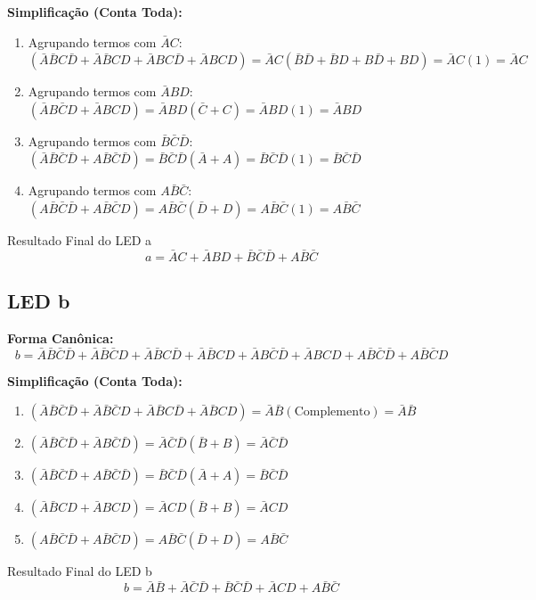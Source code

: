 \documentclass[12pt]{article}
\begin{document}
\textbf{Simplificação (Conta Toda):}
\begin{enumerate}
    \item Agrupando termos com $\bar{A}C$:
    $(\bar{A}\bar{B}C\bar{D} + \bar{A}\bar{B}CD + \bar{A}BC\bar{D} + \bar{A}BCD) = \bar{A}C(\bar{B}\bar{D} + \bar{B}D + B\bar{D} + BD) = \bar{A}C(1) = \bar{A}C$
    \item Agrupando termos com $\bar{A}BD$:
    $(\bar{A}B\bar{C}D + \bar{A}BCD) = \bar{A}BD(\bar{C} + C) = \bar{A}BD(1) = \bar{A}BD$
    \item Agrupando termos com $\bar{B}\bar{C}\bar{D}$:
    $(\bar{A}\bar{B}\bar{C}\bar{D} + A\bar{B}\bar{C}\bar{D}) = \bar{B}\bar{C}\bar{D}(\bar{A}+A) = \bar{B}\bar{C}\bar{D}(1) = \bar{B}\bar{C}\bar{D}$
    \item Agrupando termos com $A\bar{B}\bar{C}$:
    $(A\bar{B}\bar{C}\bar{D} + A\bar{B}\bar{C}D) = A\bar{B}\bar{C}(\bar{D}+D) = A\bar{B}\bar{C}(1) = A\bar{B}\bar{C}$
\end{enumerate}

\begin{block}{Resultado Final do LED a}
  \[ a = \bar{A}C + \bar{A}BD + \bar{B}\bar{C}\bar{D} + A\bar{B}\bar{C} \]
\end{block}

\subsection*{LED \textbf{b}}
\textbf{Forma Canônica:}
\[ b = \bar{A}\bar{B}\bar{C}\bar{D} + \bar{A}\bar{B}\bar{C}D + \bar{A}\bar{B}C\bar{D} + \bar{A}\bar{B}CD + \bar{A}B\bar{C}\bar{D} + \bar{A}BCD + A\bar{B}\bar{C}\bar{D} + A\bar{B}\bar{C}D \]

\textbf{Simplificação (Conta Toda):}
\begin{enumerate}
    \item $(\bar{A}\bar{B}\bar{C}\bar{D} + \bar{A}\bar{B}\bar{C}D + \bar{A}\bar{B}C\bar{D} + \bar{A}\bar{B}CD) = \bar{A}\bar{B}(\text{Complemento}) = \bar{A}\bar{B}$
    \item $(\bar{A}\bar{B}\bar{C}\bar{D} + \bar{A}B\bar{C}\bar{D}) = \bar{A}\bar{C}\bar{D}(\bar{B}+B) = \bar{A}\bar{C}\bar{D}$
    \item $(\bar{A}\bar{B}\bar{C}\bar{D} + A\bar{B}\bar{C}\bar{D}) = \bar{B}\bar{C}\bar{D}(\bar{A}+A) = \bar{B}\bar{C}\bar{D}$
    \item $(\bar{A}\bar{B}CD + \bar{A}BCD) = \bar{A}CD(\bar{B}+B) = \bar{A}CD$
    \item $(A\bar{B}\bar{C}\bar{D} + A\bar{B}\bar{C}D) = A\bar{B}\bar{C}(\bar{D}+D) = A\bar{B}\bar{C}$
\end{enumerate}
\begin{block}{Resultado Final do LED b}
  \[ b = \bar{A}\bar{B} + \bar{A}\bar{C}\bar{D} + \bar{B}\bar{C}\bar{D} + \bar{A}CD + A\bar{B}\bar{C} \]
\end{block}
\end{document}
